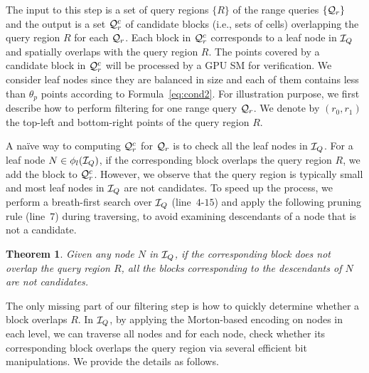 \documentclass[10pt,conference,letterpaper]{IEEEtran}
\newcommand{\rangeq}{{{\cal Q}_r}\xspace}
\newcommand{\rangecand}{{{\cal Q}_r^c}\xspace}
\newcommand{\treeindex}{{{\cal I}_Q}\xspace}
\newtheorem{theorem}{Theorem}
\begin{document}
The input to this step is a set of query regions $\{R\}$ of the range queries $\{\rangeq\}$ and the output is a set $\rangecand$ of candidate blocks (i.e., sets of cells) overlapping the query region $R$ for each  $\rangeq$. Each block in $\rangecand$ corresponds to a leaf node in $\treeindex$ and spatially overlaps with the query region $R$. The points covered by a candidate block in $\rangecand$ will be processed by a GPU SM for verification. We consider leaf nodes since they are balanced in size and each of them contains less than $\theta_p$ points according to Formula~\ref{eq:cond2}.
For illustration purpose, we first describe how to perform filtering for one range query $\rangeq$.
We denote by $(r_0, r_1)$ the top-left and bottom-right points of the query region $R$.

A na\"ive way to computing $\rangecand$ for $\rangeq$ is to check all the leaf nodes in $\treeindex$. For a leaf node $N\in\phi_l(\treeindex)$, if the corresponding block overlaps the query region $R$, we add the block to $\rangecand$.
However, we observe that the query region is typically small and most leaf nodes in $\treeindex$ are not candidates.
To speed up the process, we perform a breath-first search over $\treeindex$ (line~$4$-$15$) and apply the following pruning rule (line~$7$) during traversing, to avoid examining descendants of a node that is not a candidate.
%
\begin{theorem}\label{le:rangeprune}
	Given any node $N$ in $\treeindex$, if the corresponding block does not overlap the query region $R$, all the blocks corresponding to the descendants of $N$ are not candidates.
\end{theorem}


The only missing part of our filtering step is how to quickly determine whether a block overlaps $R$.
In $\treeindex$, by applying the Morton-based encoding on nodes in each level, we can traverse all nodes and for each node, check whether its corresponding block overlaps the query region via several efficient bit manipulations. 
We provide the details as follows.
\end{document}
